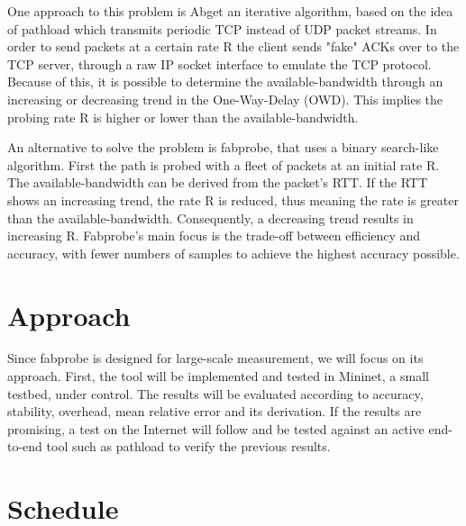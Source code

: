 \documentclass[NET,a4,12pt,english]{netforms}
\begin{document}
One approach to this problem is Abget an iterative algorithm, based on the idea of pathload which transmits periodic TCP instead of UDP packet streams. In order to send packets at a certain rate R the client sends "fake" ACKs over to the TCP server, through a raw IP socket interface to emulate the TCP protocol. \cite{proceedings:passivactivemeas} 
Because of this, it is possible to determine the available-bandwidth through an increasing or decreasing trend in the One-Way-Delay (OWD). This implies the probing rate R is higher or lower than the available-bandwidth.

An alternative to solve the problem is fabprobe, that uses a binary search-like algorithm. \cite{fabprobe} %
First the path is probed with a fleet of packets at an initial rate R. The available-bandwidth can be derived from the packet's RTT. If the RTT shows an increasing trend, the rate R is reduced, thus meaning the rate is greater than the available-bandwidth. Consequently, a decreasing trend results in increasing R. Fabprobe's main focus is the trade-off between efficiency and accuracy, with fewer numbers of samples to achieve the highest accuracy possible.

\section*{Approach}
Since fabprobe is designed for large-scale measurement, we will focus on its approach. First, the tool will be implemented and tested in Mininet, a small testbed, under control.
The results will be evaluated according to accuracy, stability, overhead, mean relative error and its derivation. If the results are promising, a test on the Internet will follow and be tested against an active end-to-end tool such as pathload to verify the previous results. 

\section*{Schedule}

\resizebox{\textwidth}{!}{
\begin{ganttchart}[hgrid, vgrid={dotted}, group label font={\bf}, x unit=7mm, bar/.append group/.append style={draw=black}]{1}{20}
\gantttitle[y unit title = 1.7 cm]{December}{4}
\gantttitle[y unit title = 1.7 cm]{January}{4}
\gantttitle[y unit title = 1.7 cm]{February}{4}
\gantttitle[y unit title = 1.7 cm]{March}{4}
\gantttitle[y unit title = 1.7 cm]{April}{4}\\

\ganttbar{Analysis}{1}{4}\\
\ganttbar{Implementation}{5}{14}\\
\ganttbar{Testbed setup}{7}{16}\\
\ganttbar{Testing and Validation}{8}{16}\\
\ganttbar{Thesis writing}{9}{18}]
\end{ganttchart}
} %



\end{document}
